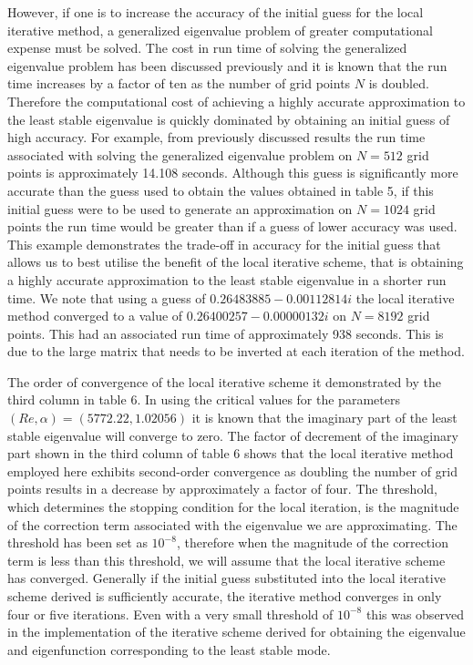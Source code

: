 \documentclass[a4paper, 12pt, twoside, openright]{article}
\numberwithin{equation}{section}
\begin{document}
However, if one is to increase the accuracy of the initial guess for the local iterative method, a generalized eigenvalue problem of greater computational expense must be solved. The cost in run time of solving the generalized eigenvalue problem has been discussed previously and it is known that the run time increases by a factor of ten as the number of grid points $N$ is doubled. Therefore the computational cost of achieving a highly accurate approximation to the least stable eigenvalue is quickly dominated by obtaining an initial guess of high accuracy. For example, from previously discussed results the run time associated with solving the generalized eigenvalue problem on $N=512$ grid points is approximately 14.108 seconds. Although this guess is significantly more accurate than the guess used to obtain the values obtained in table 5, if this initial guess were to be used to generate an approximation on $N=1024$ grid points the run time would be greater than if a guess of lower accuracy was used. This example demonstrates the trade-off in accuracy for the initial guess that allows us to best utilise the benefit of the local iterative scheme, that is obtaining a highly accurate approximation to the least stable eigenvalue in a shorter run time. We note that using a guess of $ 0.26483885 - 0.00112814i $ the local iterative method converged to a value of $0.26400257 - 0.00000132i$ on $N=8192$ grid points. This had an associated run time of approximately 938 seconds. This is due to the large matrix that needs to be inverted at each iteration of the method.%

The order of convergence of the local iterative scheme it demonstrated by the third column in table 6. In using the critical values for the parameters $(Re, \alpha) = (5772.22,1.02056)$ it is known that the imaginary part of the least stable eigenvalue will converge to zero. The factor of decrement of the imaginary part shown in the third column of table 6 shows that the local iterative method employed here exhibits second-order convergence as doubling the number of grid points results in a decrease by approximately a factor of four. The threshold, which determines the stopping condition for the local iteration, is the magnitude of the correction term associated with the eigenvalue we are approximating. The threshold has been set as $10^{-8}$, therefore when the magnitude of the correction term is less than this threshold, we will assume that the local iterative scheme has converged. Generally if the initial guess substituted into the local iterative scheme derived is sufficiently accurate, the iterative method converges in only four or five iterations. Even with a very small threshold of $10^{-8}$ this was observed in the implementation of the iterative scheme derived for obtaining the eigenvalue and eigenfunction corresponding to the least stable mode. %
\end{document}

